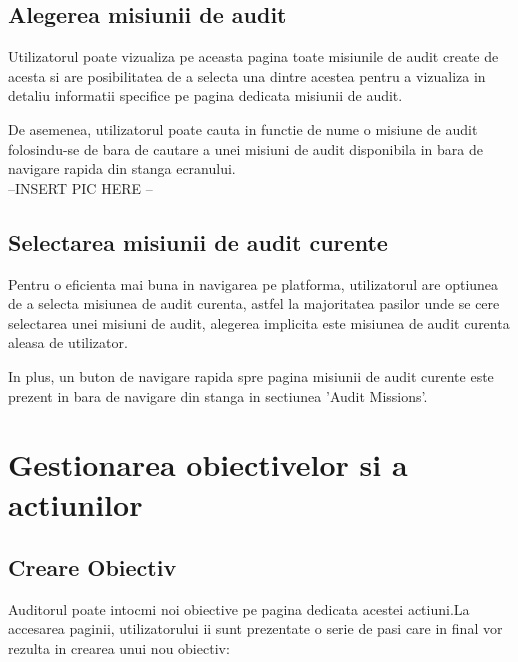 \subsection*{Alegerea misiunii de audit }
Utilizatorul poate vizualiza pe aceasta pagina toate misiunile de audit create de acesta si are posibilitatea de a selecta una dintre acestea pentru a vizualiza in detaliu informatii specifice pe pagina dedicata misiunii de audit. 

De asemenea, utilizatorul poate cauta in functie de nume o misiune de audit folosindu-se de bara de cautare a unei misiuni de audit disponibila in bara de navigare rapida din stanga ecranului.\\
--INSERT PIC HERE -- \\

\subsection*{Selectarea misiunii de audit curente}
Pentru o eficienta mai buna in navigarea pe platforma, utilizatorul are optiunea de a selecta misiunea de audit curenta, astfel la majoritatea pasilor unde se cere selectarea unei misiuni de audit, alegerea implicita este misiunea de audit  curenta aleasa de utilizator.

In plus, un buton de navigare rapida spre pagina misiunii de audit curente este prezent in bara de navigare din stanga in sectiunea 'Audit Missions'.

\section{Gestionarea obiectivelor si a actiunilor}

\subsection*{Creare Obiectiv}
Auditorul poate intocmi noi obiective pe pagina dedicata acestei actiuni.La accesarea paginii, utilizatorului ii sunt prezentate o serie de pasi care in final vor rezulta in crearea unui nou obiectiv:

